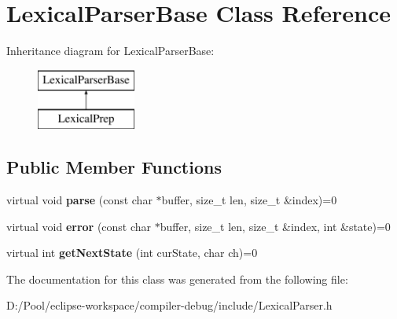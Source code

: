\hypertarget{class_lexical_parser_base}{}\section{Lexical\+Parser\+Base Class Reference}
\label{class_lexical_parser_base}
Inheritance diagram for Lexical\+Parser\+Base\+:\begin{figure}[H]
\begin{center}
\leavevmode
\includegraphics[height=2.000000cm]{class_lexical_parser_base}
\end{center}
\end{figure}
\subsection*{Public Member Functions}
\begin{DoxyCompactItemize}
\item 
\mbox{\label{class_lexical_parser_base_ae490e4942ede17406fc3ea288a41dba5}} 
virtual void {\bfseries parse} (const char $\ast$buffer, size\+\_\+t len, size\+\_\+t \&index)=0
\item 
\mbox{\label{class_lexical_parser_base_a21ee1453e87a63d194cacd9283a7b55a}} 
virtual void {\bfseries error} (const char $\ast$buffer, size\+\_\+t len, size\+\_\+t \&index, int \&state)=0
\item 
\mbox{\label{class_lexical_parser_base_a4ca2ae98fd5f5f55a3a84db9e465121e}} 
virtual int {\bfseries get\+Next\+State} (int cur\+State, char ch)=0
\end{DoxyCompactItemize}


The documentation for this class was generated from the following file\+:\begin{DoxyCompactItemize}
\item 
D\+:/\+Pool/eclipse-\/workspace/compiler-\/debug/include/Lexical\+Parser.\+h\end{DoxyCompactItemize}
